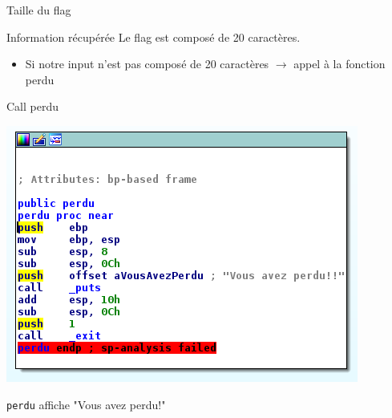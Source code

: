 \documentclass[10pt,sans,usenames,dvipsnames,french,compress]{beamer}
\begin{document}
\begin{frame}[fragile]{Taille du flag}
	\begin{block}{Information récupérée}
		Le flag est composé de 20 caractères.
	\end{block}

	\begin{exampleblock}{}
		\begin{itemize}
			\item Si notre input n'est pas composé de 20 caractères $ \rightarrow $ appel à la fonction perdu
		\end{itemize}
	\end{exampleblock}
\end{frame}

\begin{frame}[fragile]{Call perdu}
 	\begin{center}
		\includegraphics[width=0.5\linewidth]{114/perdu.png}
	\end{center}

	\begin{block}{}
		\texttt{perdu} affiche "Vous avez perdu!"
	\end{block}
\end{frame}
\end{document}
